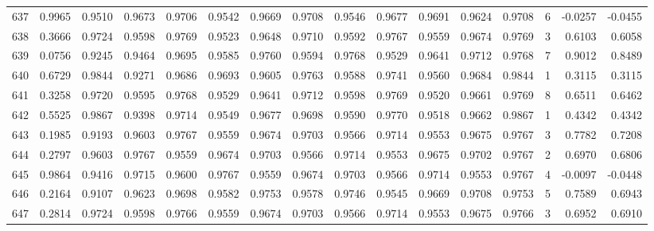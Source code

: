 \begin{tabular}{lrrrrrrrrrrrrrrr}
637 &      0.9965 &  0.9510 &  0.9673 &  0.9706 &  0.9542 &  0.9669 &  0.9708 &  0.9546 &  0.9677 &  0.9691 &   0.9624 &     0.9708 &      6 &                   -0.0257 &                    -0.0455 \\
638 &      0.3666 &  0.9724 &  0.9598 &  0.9769 &  0.9523 &  0.9648 &  0.9710 &  0.9592 &  0.9767 &  0.9559 &   0.9674 &     0.9769 &      3 &                    0.6103 &                     0.6058 \\
639 &      0.0756 &  0.9245 &  0.9464 &  0.9695 &  0.9585 &  0.9760 &  0.9594 &  0.9768 &  0.9529 &  0.9641 &   0.9712 &     0.9768 &      7 &                    0.9012 &                     0.8489 \\
640 &      0.6729 &  0.9844 &  0.9271 &  0.9686 &  0.9693 &  0.9605 &  0.9763 &  0.9588 &  0.9741 &  0.9560 &   0.9684 &     0.9844 &      1 &                    0.3115 &                     0.3115 \\
641 &      0.3258 &  0.9720 &  0.9595 &  0.9768 &  0.9529 &  0.9641 &  0.9712 &  0.9598 &  0.9769 &  0.9520 &   0.9661 &     0.9769 &      8 &                    0.6511 &                     0.6462 \\
642 &      0.5525 &  0.9867 &  0.9398 &  0.9714 &  0.9549 &  0.9677 &  0.9698 &  0.9590 &  0.9770 &  0.9518 &   0.9662 &     0.9867 &      1 &                    0.4342 &                     0.4342 \\
643 &      0.1985 &  0.9193 &  0.9603 &  0.9767 &  0.9559 &  0.9674 &  0.9703 &  0.9566 &  0.9714 &  0.9553 &   0.9675 &     0.9767 &      3 &                    0.7782 &                     0.7208 \\
644 &      0.2797 &  0.9603 &  0.9767 &  0.9559 &  0.9674 &  0.9703 &  0.9566 &  0.9714 &  0.9553 &  0.9675 &   0.9702 &     0.9767 &      2 &                    0.6970 &                     0.6806 \\
645 &      0.9864 &  0.9416 &  0.9715 &  0.9600 &  0.9767 &  0.9559 &  0.9674 &  0.9703 &  0.9566 &  0.9714 &   0.9553 &     0.9767 &      4 &                   -0.0097 &                    -0.0448 \\
646 &      0.2164 &  0.9107 &  0.9623 &  0.9698 &  0.9582 &  0.9753 &  0.9578 &  0.9746 &  0.9545 &  0.9669 &   0.9708 &     0.9753 &      5 &                    0.7589 &                     0.6943 \\
647 &      0.2814 &  0.9724 &  0.9598 &  0.9766 &  0.9559 &  0.9674 &  0.9703 &  0.9566 &  0.9714 &  0.9553 &   0.9675 &     0.9766 &      3 &                    0.6952 &                     0.6910 \\

\end{tabular}

